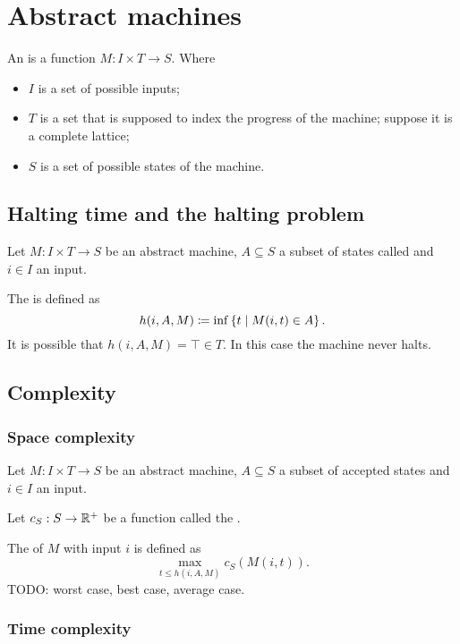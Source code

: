 \section{Abstract machines}
\begin{definition}
An  is a function $M: I\times T \to S$. Where
\begin{itemize}
\item $I$ is a set of possible inputs;
\item $T$ is a set that is supposed to index the progress of the machine; suppose it is a complete lattice;
\item $S$ is a set of possible states of the machine.
\end{itemize}
\end{definition}

\subsection{Halting time and the halting problem}
\begin{definition}
Let $M: I\times T \to S$ be an abstract machine, $A \subseteq S$ a subset of states called  and $i\in I$ an input.

The  is defined as
\[ h(i,A, M) \coloneqq \inf\left\{ t \;\middle|\; M(i,t) \in A \right\}. \]
It is possible that $h(i,A, M) = \top \in T$. In this case the machine never halts.
\end{definition}

\subsection{Complexity}
\subsubsection{Space complexity}
\begin{definition}
Let  $M: I\times T \to S$ be an abstract machine, $A \subseteq S$ a subset of accepted states and $i\in I$ an input.

Let $c_S: S\to \mathbb{R}^+$ be a function called the .

The  of $M$ with input $i$ is defined as
\[ \max_{t\leq h(i,A,M)} c_S(M(i,t)). \]
TODO: worst case, best case, average case.
\end{definition}

\subsubsection{Time complexity}
\begin{definition}

\end{definition}


